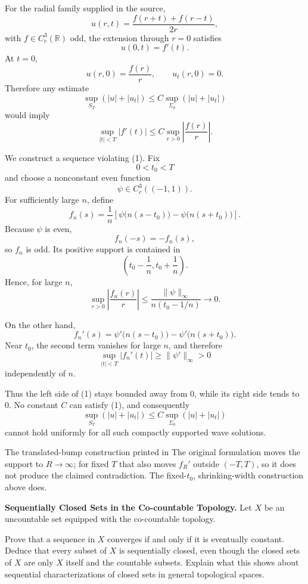 \begin{solution}
For the radial family supplied in the source,
\[
u(r,t)
=
\frac{f(r+t)+f(r-t)}{2r},
\]
with \(f\in C_c^3(\mathbb R)\) odd, the extension through \(r=0\) satisfies
\[
u(0,t)=f'(t).
\]
At \(t=0\),
\[
u(r,0)=\frac{f(r)}r,
\qquad
u_t(r,0)=0.
\]
Therefore any estimate
\[
\sup_{S_T}(|u|+|u_t|)
\le
C\sup_{\Sigma_0}(|u|+|u_t|)
\]
would imply
\[
\sup_{|t|<T}|f'(t)|
\le
C\sup_{r>0}\left|\frac{f(r)}r\right|.
\tag{1}
\]

We construct a sequence violating (1). Fix
\[
0<t_0<T
\]
and choose a nonconstant even function
\[
\psi\in C_c^3((-1,1)).
\]
For sufficiently large \(n\), define
\[
f_n(s)
=
\frac1n
\left[
\psi\bigl(n(s-t_0)\bigr)
-
\psi\bigl(n(s+t_0)\bigr)
\right].
\]
Because \(\psi\) is even,
\[
f_n(-s)=-f_n(s),
\]
so \(f_n\) is odd. Its positive support is contained in
\[
\left(t_0-\frac1n,t_0+\frac1n\right).
\]
Hence, for large \(n\),
\[
\sup_{r>0}
\left|\frac{f_n(r)}r\right|
\le
\frac{\|\psi\|_\infty}
{n(t_0-1/n)}
\longrightarrow0.
\]

On the other hand,
\[
f_n'(s)
=
\psi'\bigl(n(s-t_0)\bigr)
-
\psi'\bigl(n(s+t_0)\bigr).
\]
Near \(t_0\), the second term vanishes for large \(n\), and therefore
\[
\sup_{|t|<T}|f_n'(t)|
\ge
\|\psi'\|_\infty>0
\]
independently of \(n\).

Thus the left side of (1) stays bounded away from \(0\), while its right side tends to \(0\).
No constant \(C\) can satisfy (1), and consequently
\[
\boxed{
\sup_{S_T}(|u|+|u_t|)
\le
C\sup_{\Sigma_0}(|u|+|u_t|)
}
\]
cannot hold uniformly for all such compactly supported wave solutions.

The translated-bump construction printed in The original formulation moves the support to
\(R\to\infty\); for fixed \(T\) that also moves \(f_R'\) outside \((-T,T)\), so it does not
produce the claimed contradiction. The fixed-\(t_0\), shrinking-width construction above
does.
\end{solution}


\begin{problem}[CP-II-0453]
\label{prob:cp-ii-0453}
\textbf{Sequentially Closed Sets in the Co-countable Topology.}
Let \(X\) be an uncountable set equipped with the co-countable topology.

Prove that a sequence in \(X\) converges if and only if it is eventually
constant. Deduce that every subset of \(X\) is sequentially closed, even though
the closed sets of \(X\) are only \(X\) itself and the countable subsets.
Explain what this shows about sequential characterizations of closed sets in
general topological spaces.
\end{problem}

